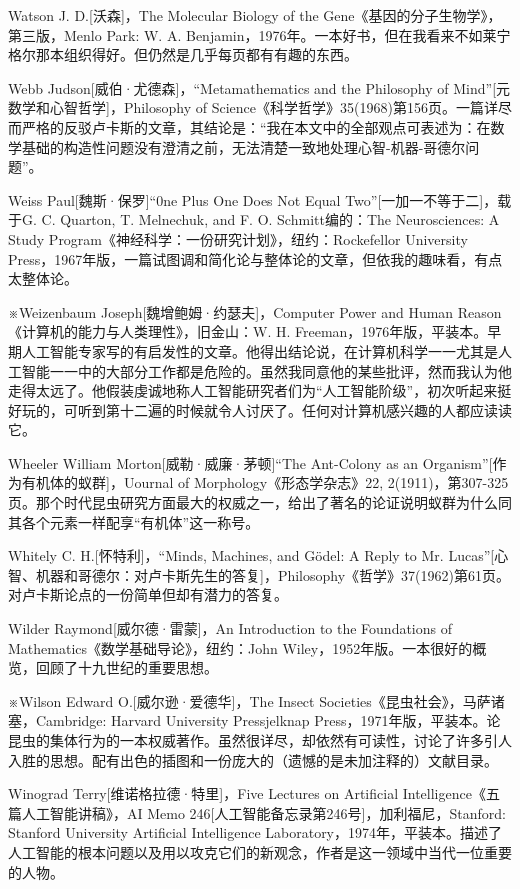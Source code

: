 \documentclass[
  12pt,
  twoside,
  openright,
  oldfontcommands,
]{memoir}
\begin{document}
Watson J. D.{[}沃森{]}，The Molecular Biology of the Gene《基因的分子生物学》，第三版，Menlo Park: W. A. Benjamin，1976年。一本好书，但在我看来不如莱宁格尔那本组织得好。但仍然是几乎每页都有有趣的东西。

Webb Judson{[}威伯·尤德森{]}，``Metamathematics and the Philosophy of Mind''{[}元数学和心智哲学{]}，Philosophy of Science《科学哲学》35(1968)第156页。一篇详尽而严格的反驳卢卡斯的文章，其结论是：``我在本文中的全部观点可表述为：在数学基础的构造性问题没有澄清之前，无法清楚一致地处理心智-机器-哥德尔问题''。

Weiss Paul{[}魏斯·保罗{]}``0ne Plus One Does Not Equal Two''{[}一加一不等于二{]}，载于G. C. Quarton, T. Melnechuk, and F. O. Schmitt编的：The Neurosciences: A Study Program《神经科学：一份研究计划》，纽约：Rockefellor University Press，1967年版，一篇试图调和简化论与整体论的文章，但依我的趣味看，有点太整体论。

※Weizenbaum Joseph{[}魏增鲍姆·约瑟夫{]}，Computer Power and Human Reason《计算机的能力与人类理性》，旧金山：W. H. Freeman，1976年版，平装本。早期人工智能专家写的有启发性的文章。他得出结论说，在计算机科学一一尤其是人工智能一一中的大部分工作都是危险的。虽然我同意他的某些批评，然而我认为他走得太远了。他假装虔诚地称人工智能研究者们为``人工智能阶级''，初次听起来挺好玩的，可听到第十二遍的时候就令人讨厌了。任何对计算机感兴趣的人都应读读它。

Wheeler William Morton{[}威勒·威廉·茅顿{]}``The Ant-Colony as an Organism''{[}作为有机体的蚁群{]}，Uournal of Morphology《形态学杂志》22, 2(1911)，第307-325页。那个时代昆虫研究方面最大的权威之一，给出了著名的论证说明蚁群为什么同其各个元素一样配享``有机体''这一称号。

Whitely C. H.{[}怀特利{]}，``Minds, Machines, and Gödel: A Reply to Mr. Lucas''{[}心智、机器和哥德尔：对卢卡斯先生的答复{]}，Philosophy《哲学》37(1962)第61页。对卢卡斯论点的一份简单但却有潜力的答复。

Wilder Raymond{[}威尔德·雷蒙{]}，An Introduction to the Foundations of Mathematics《数学基础导论》，纽约：John Wiley，1952年版。一本很好的概览，回顾了十九世纪的重要思想。

※Wilson Edward O.{[}威尔逊·爱德华{]}，The Insect Societies《昆虫社会》，马萨诸塞，Cambridge: Harvard University Pressjelknap Press，1971年版，平装本。论昆虫的集体行为的一本权威著作。虽然很详尽，却依然有可读性，讨论了许多引人入胜的思想。配有出色的插图和一份庞大的（遗憾的是未加注释的）文献目录。

Winograd Terry{[}维诺格拉德·特里{]}，Five Lectures on Artificial Intelligence《五篇人工智能讲稿》，AI Memo 246{[}人工智能备忘录第246号{]}，加利福尼，Stanford: Stanford University Artificial Intelligence Laboratory，1974年，平装本。描述了人工智能的根本问题以及用以攻克它们的新观念，作者是这一领域中当代一位重要的人物。
\end{document}
